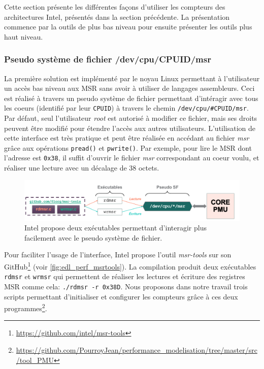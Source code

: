     
    Cette section présente les différentes façons d'utiliser les compteurs des architectures Intel, présentés dans la section précédente. La présentation commence par la outils de plus bas niveau pour ensuite présenter les outils plus haut niveau.
 
 
    \subsubsection{Pseudo système de fichier /dev/cpu/CPUID/msr}
    La première solution est implémenté par le noyau Linux permettant à l'utilisateur un accès bas niveau aux MSR sans avoir à utiliser de langages assembleurs. Ceci est réalisé à travers un pseudo système de fichier permettant d'intéragir avec tous les coeurs (identifié par leur \verb|CPUID|) à travers le chemin \verb|/dev/cpu/#CPUID/msr|. Par défaut, seul l'utilisateur \textit{root} est autorisé à modifier ce fichier, mais ses droits peuvent être modifié pour étendre l'accès aux autres utilisateurs. L'utilisation de cette interface est très pratique et peut être réalisée en accédant au fichier \textit{msr} grâce aux opérations \verb|pread()| et \verb|pwrite()|. Par exemple, pour lire le MSR dont l'adresse est \verb|0x38|, il suffit d'ouvrir le fichier \textit{msr} correspondant au coeur voulu, et réaliser une lecture avec un décalage de 38 octets.
    
    \begin{figure}[h!]
    \center
    \includegraphics[width=14cm]{images/edl_perf_msrtools.png}
    \caption{\label{fig:edl_perf_msrtools} Intel propose deux exécutables permettant d'interagir plus facilement avec le pseudo système de fichier.}
    \end{figure}

    Pour faciliter l'usage de l'interface, Intel propose l'outil \textit{msr-tools} sur son GitHub\footnote{\url{https://github.com/intel/msr-tools}} (voir \autoref{fig:edl_perf_msrtools}).  La compilation produit deux exécutables \verb|rdmsr| et \verb|wrmsr| qui permettent de réaliser les lectures et écriture des registres MSR comme cela: \verb|./rdmsr -r 0x38D|. Nous proposons dans notre travail trois scripts permettant d'initialiser et configurer les compteurs grâce à ces deux programmes\footnote{\url{https://github.com/PourroyJean/performance_modelisation/tree/master/src/tool_PMU}}. 
    
